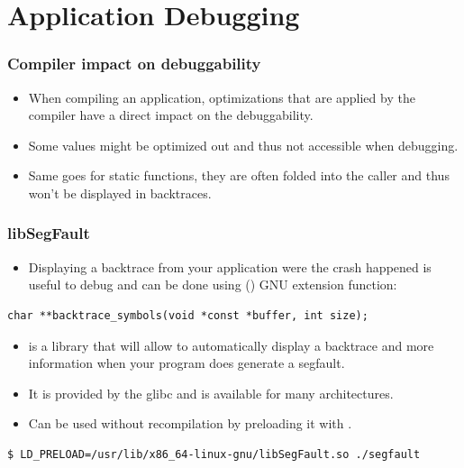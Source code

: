 \section{Application Debugging}

\begin{frame}
  \frametitle{Compiler impact on debuggability}
  \begin{itemize}
    \item When compiling an application, optimizations that are applied by the
          compiler have a direct impact on the debuggability.
    \item Some values might be optimized out and thus not accessible when
          debugging.
    \item Same goes for static functions, they are often folded into the caller
          and thus won't be displayed in backtraces.
  \end{itemize}
\end{frame}

\begin{frame}[fragile]
  \frametitle{libSegFault}
  \begin{itemize}
      \item Displaying a backtrace from your application were the crash happened
            is useful to debug and can be done using 
            () GNU extension function:
  \end{itemize}
    \begin{block}{}
      \begin{verbatim}
char **backtrace_symbols(void *const *buffer, int size);
      \end{verbatim}
    \end{block}

  \begin{itemize}
    \item {} is a library that will allow to automatically display a
          backtrace and more information when your program does generate a
          segfault.
    \item It is provided by the glibc and is available for many architectures.
    \item Can be used without recompilation by preloading it with .
  \end{itemize}
  \begin{block}{}
    \begin{verbatim}
$ LD_PRELOAD=/usr/lib/x86_64-linux-gnu/libSegFault.so ./segfault
    \end{verbatim}
  \end{block}
\end{frame}

